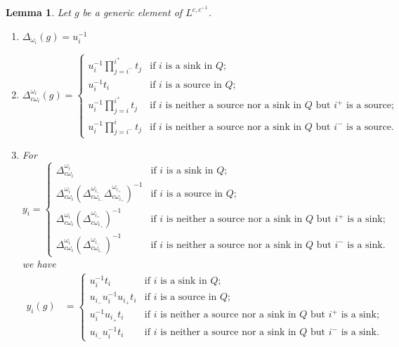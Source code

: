 \documentclass[11pt]{amsart}
\newtheorem{lemma}[theorem]{Lemma}
\numberwithin{equation}{section}
\begin{document}
  \begin{lemma}\mbox{}
    Let $g$ be a generic element of $L^{c,c^{-1}}$.
    \begin{enumerate}
      \item $\Delta_{\omega_i}(g)=u_i^{-1}$
      \item $\Delta_{c\omega_i}^{\omega_i}(g)=\begin{cases}u_i^{-1}\prod\limits_{j=i^-}^{i^+}t_j & \text{if $i$ is a sink in $Q$;}\\u_i^{-1}t_i & \text{if $i$ is a source in $Q$;}\\u_i^{-1}\prod\limits_{j=i}^{i^+}t_j & \text{if $i$ is neither a source nor a sink in $Q$ but $i^+$ is a source;}\\u_i^{-1}\prod\limits_{j=i^-}^it_j & \text{if $i$ is neither a source nor a sink in $Q$ but $i^-$ is a source.}\end{cases}$
      \item For 
      \begin{equation}
        y_i=\begin{cases}\Delta_{c\omega_i}^{\omega_i} & \text{if $i$ is a sink in $Q$;}\\\Delta_{c\omega_i}^{\omega_i}\left(\Delta_{c\omega_{i_-}}^{\omega_{i_-}}\Delta_{c\omega_{i_+}}^{\omega_{i_+}}\right)^{-1} & \text{if $i$ is a source in $Q$;}\\\Delta_{c\omega_i}^{\omega_i}\left(\Delta_{c\omega_{i_+}}^{\omega_{i_+}}\right)^{-1} & \text{if $i$ is neither a source nor a sink in $Q$ but $i^+$ is a sink;}\\\Delta_{c\omega_i}^{\omega_i}\left(\Delta_{c\omega_{i_-}}^{\omega_{i_-}}\right)^{-1} & \text{if $i$ is neither a source nor a sink in $Q$ but $i^-$ is a sink.}\end{cases}
      \end{equation}
      we have
      \begin{align}
        y_i(g)&=\begin{cases}u_i^{-1}t_i & \text{if $i$ is a sink in $Q$;}\\u_{i_-}u_i^{-1}u_{i_+}t_i & \text{if $i$ is a source in $Q$;}\\u_i^{-1}u_{i_+}t_i & \text{if $i$ is neither a source nor a sink in $Q$ but $i^+$ is a sink;}\\u_{i_-}u_i^{-1}t_i & \text{if $i$ is neither a source nor a sink in $Q$ but $i^-$ is a sink.}\end{cases}
      \end{align}
    \end{enumerate}
  \end{lemma}
\end{document}

